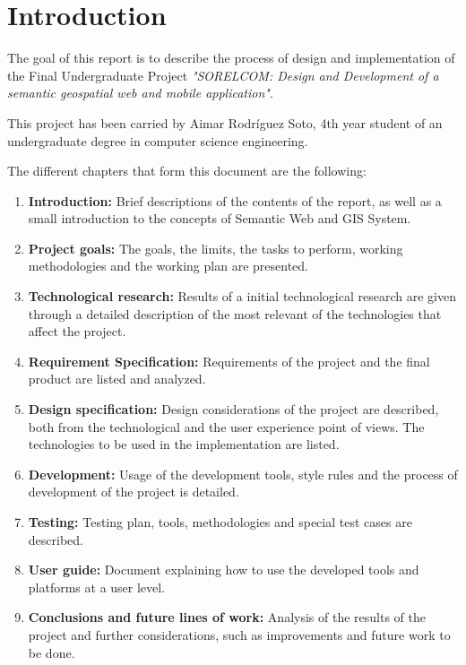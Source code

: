 \chapter{Introduction}\label{cha:intro}

The goal of this report is to describe the process of design and implementation of the Final Undergraduate Project \textit{"SORELCOM: Design and Development of a semantic geospatial web and mobile application"}.

This project has been carried by Aimar Rodr\'iguez Soto, 4th year student of an undergraduate degree in computer science engineering.

The different chapters that form this document are the following:

\begin{enumerate}
	\item \textbf{Introduction:} Brief descriptions of the contents of the report, as well as a small introduction to the concepts of Semantic Web and GIS System.
	
	\item \textbf{Project goals:} The goals, the limits, the tasks to perform, working methodologies and the working plan are presented.
	
	\item \textbf{Technological research:} Results of a initial technological research are given through a detailed description of the most relevant of the technologies that affect the project.
	
	\item \textbf{Requirement Specification:} Requirements of the project and the final product are listed and analyzed.
	
	\item \textbf{Design specification:} Design considerations of the project are described, both from the technological and the user experience point of views. The technologies to be used in the implementation are listed.
	
	\item \textbf{Development:} Usage of the development tools, style rules and the process of development of the project is detailed.
	
	\item \textbf{Testing:} Testing plan, tools, methodologies and special test cases are described. 
	
	\item \textbf{User guide:} Document explaining how to use the developed tools and platforms at a user level.
	
	\item \textbf{Conclusions and future lines of work:} Analysis of the results of the project and further considerations, such as improvements and future work to be done.
\end{enumerate}

